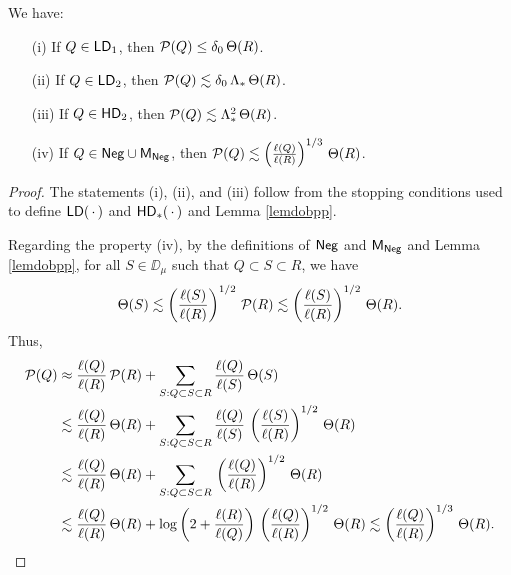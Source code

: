 \vv
\begin{lemma}\label{lempoiss} 
We have:
\begin{itemize}
\item[(i)] If $Q\in{\mathsf{LD}}_1$, then ${\mathcal P}(Q)\leq \delta_0\,\Theta(R)$.
\item[(ii)] If $Q\in{\mathsf{LD}}_2$, then ${\mathcal P}(Q)\lesssim \delta_0\,\Lambda_*\,\Theta(R)$.
\vspace{1mm}

\item[(iii)] If $Q\in {\mathsf{HD}}_2$, then ${\mathcal P}(Q)\lesssim \Lambda_*^2\,\Theta(R)$.

\vspace{1mm}

\item[(iv)] If $Q\in{\mathsf{Neg}}\cup{\mathsf{M}}_{\mathsf{Neg}}$, then ${\mathcal P}(Q)\lesssim \left(\frac{\ell(Q)}{\ell(R)}\right)^{1/3}\,\Theta(R)$.
\end{itemize}
\end{lemma}

\begin{proof}
The statements (i),  (ii), and (iii) follow from the stopping conditions used to define ${\mathsf{LD}}(\,\cdot\,)$
and ${\mathsf{HD}}_*(\,\cdot\,)$ and Lemma \ref{lemdobpp}.


Regarding the property (iv), by the definitions of ${\mathsf{Neg}}$ and ${\mathsf{M}}_{\mathsf{Neg}}$ and Lemma \ref{lemdobpp}, for all
$S\in\DD_\mu$ such that $Q\subset S\subset R$, we have
$$\Theta(S)\lesssim \left(\frac{\ell(S)}{\ell(R)}\right)^{1/2}\,{\mathcal P}(R)\lesssim \left(\frac{\ell(S)}{\ell(R)}\right)^{1/2}\,\Theta(R).$$
Thus,
\begin{align*}
{\mathcal P}(Q) &\approx \frac{\ell(Q)}{\ell(R)}\,{\mathcal P}(R) + \sum_{S:Q\subset S\subset R}\frac{\ell(Q)}{\ell(S)}\,\Theta(S)\\
& \lesssim \frac{\ell(Q)}{\ell(R)}\,\Theta(R) + \sum_{S:Q\subset S\subset R}\frac{\ell(Q)}{\ell(S)}
\,\left(\frac{\ell(S)}{\ell(R)}\right)^{1/2}\,\Theta(R)\\
& \lesssim \frac{\ell(Q)}{\ell(R)}\,\Theta(R) + \sum_{S:Q\subset S\subset R}\,\left(\frac{\ell(Q)}{\ell(R)}\right)^{1/2}\,\Theta(R)\\
& \lesssim \frac{\ell(Q)}{\ell(R)}\,\Theta(R) + \log\left(2+\frac{\ell(R)}{\ell(Q)}\right)\,\left(\frac{\ell(Q)}{\ell(R)}\right)^{1/2}\,\Theta(R) \lesssim \left(\frac{\ell(Q)}{\ell(R)}\right)^{1/3}\,\Theta(R).
\end{align*}

\end{proof}
\vv



